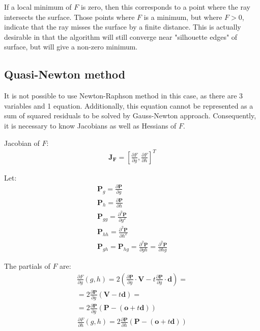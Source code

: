 \documentclass[preprint,12pt]{interact}
\begin{document}
If a local minimum of $F$ is zero, then this corresponds to a point where the ray intersects the surface. Those points where $F$ is a minimum, but where $F > 0$, indicate that the ray misses the surface by a finite distance. This is actually desirable in that the algorithm will still converge near "silhouette edges" of surface, but will give a non-zero minimum.

\subsection{Quasi-Newton method}\label{NR1}

It is not possible to use Newton-Raphson method in this case, as there are 3 variables and 1 equation. Additionally, this equation cannot be represented as a sum of squared residuals to be solved by Gauss-Newton approach. Consequently, it is necessary to know Jacobians as well as Hessians of $F$.

Jacobian of $F$:
\begin{align}
	\bm{J_F} = \left[ \frac{\partial F}{\partial g}, \frac{\partial F}{\partial h} \right]^T
\end{align}

Let:
\begin{align}
	\bm{P}_g =  \frac{\partial \bm{P}}{\partial g} \\
	\bm{P}_h =  \frac{\partial \bm{P}}{\partial h} \\
	\bm{P}_{gg} =  \frac{\partial^2 \bm{P}}{\partial g^2} \\
	\bm{P}_{hh} =  \frac{\partial^2 \bm{P}}{\partial h^2} \\
	\bm{P}_{gh} = \bm{P}_{hg} = \frac{\partial^2 \bm{P}}{\partial gh} = \frac{\partial^2 \bm{P}}{\partial hg}
\end{align}


The partials of $F$ are:
\begin{align}
	\frac{\partial F}{\partial g} (g,h) = 2 \left( \frac{\partial \bm{P}}{\partial g} \cdot \bm{V} - t \frac{\partial \bm{P}}{\partial g} \cdot \bm{d} \right) = \\
	= 2  \frac{\partial \bm{P}}{\partial g}  \left( \bm{V} - t \bm{d} \right) = \\
	= 2  \frac{\partial \bm{P}}{\partial g}  \left( \bm{P} - \left( \bm{o} + t \bm{d} \right) \right)
\end{align}
\begin{align}
	\frac{\partial F}{\partial h} (g,h) = 2  \frac{\partial \bm{P}}{\partial h}  \left( \bm{P} - \left( \bm{o} + t \bm{d} \right) \right)
\end{align} 
\end{document}
